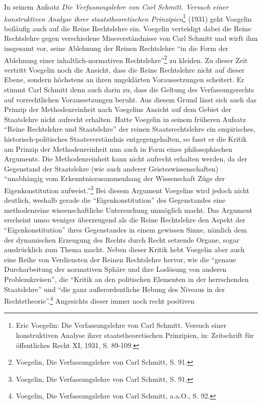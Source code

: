 \documentclass[12pt,a4paper,ngerman]{article}
\begin{document}
In seinem Aufsatz {\em Die Verfassungslehre von Carl Schmitt. Versuch einer
  konstruktiven Analyse ihrer staatstheoretischen Prinzipien}\footnote{Eric
  Voegelin: Die Verfassungslehre von Carl Schmitt. Versuch einer konstruktiven
  Analyse ihrer staatstheoretischen Prinzipien, in: Zeitschrift für
  öffentliches Recht XI, 1931, S. 89-109.} (1931) geht Voegelin beiläufig auch
auf die Reine Rechtslehre ein. Voegelin verteidigt dabei die Reine Rechtslehre
gegen verschiedene Missverständnisse von Carl Schmitt und wirft ihm insgesamt
vor, seine Ablehnung der Reinen Rechtslehre "`in die Form der Ablehnung einer
inhaltlich-normativen Rechtslehre"'\footnote{Voegelin, Die Verfassungslehre
  von Carl Schmitt, S. 91.} zu kleiden. Zu dieser Zeit vertritt Voegelin noch
die Ansicht, dass die Reine Rechtslehre nicht auf dieser Ebene, sondern
höchstens an ihren ungeklärten Voraussetzungen scheitert. Er stimmt Carl
Schmitt denn auch darin zu, dass die Geltung des Verfassungsrechts auf
vorrechtlichen Voraussetzungen beruht. Aus diesem Grund lässt sich auch das
Prinzip der Methodenreinheit nach Voegelins Ansicht auf dem Gebiet der
Staatslehre nicht aufrecht erhalten.  Hatte Voegelin in seinem früheren
Aufsatz "`Reine Rechtslehre und Staatslehre"' der reinen Staatsrechtslehre ein
empirisches, historisch-politisches Staatsverständnis entgegengehalten, so
fasst er die Kritik am Prinzip der Methodenreinheit nun auch in Form eines
philosophischen Arguments. Die Methodenreinheit kann nicht aufrecht erhalten
werden, da der Gegenstand der Staatslehre (wie auch anderer
Geisteswissenschaften) "`unabhängig vom Erkenntniszusammenhang der
Wissenschaft Züge der Eigenkonstitution aufweist."'\footnote{Voegelin, Die
  Verfassungslehre von Carl Schmitt, S. 91.}  Bei diesem Argument Voegelins
wird jedoch nicht deutlich, weshalb gerade die "`Eigenkonstitution"' des
Gegenstandes eine methodenreine wissenschaftliche Untersuchung unmöglich
macht. Das Argument erscheint umso weniger überzeugend als die Reine
Rechtslehre den Aspekt der "`Eigenkonstitution"' ihres Gegenstandes in einem
gewissen Sinne, nämlich dem der dynamischen Erzeugung des Rechts durch Recht
setzende Organe, sogar ausdrücklich zum Thema macht.  Neben dieser Kritik hebt
Voegelin aber auch eine Reihe von Verdiensten der Reinen Rechtslehre hervor,
wie die "`genaue Durcharbeitung der normativen Sphäre und ihre Loslösung von
anderen Problemkreisen"', die "`Kritik an den politischen Elementen in der
herrschenden Staatslehre"' und "`die ganz außerordentliche Hebung des Niveaus
in der Rechtstheorie"'.\footnote{Voegelin, Die Verfassungslehre von Carl
  Schmitt, a.a.O., S. 92.} Angesichts dieser immer noch recht positiven
\end{document}
